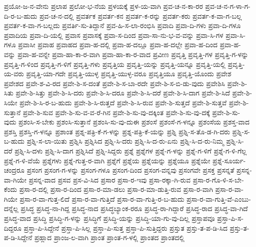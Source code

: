 {ಪ್ರಯೋ-ಜ-ನ-ವೇನು
ಪ್ರಲಾಪ
ಪ್ರಲೋ-ಭ-ನೆಯ
ಪ್ರಳಯಕ್ಕೆ
ಪ್ರಳ-ಯ-ವಾಗಿ
ಪ್ರವ-ಚ-ನ-ಕಾ-ರರ
ಪ್ರವ-ಚ-ನ-ಗ-ಳಾ-ಗ-ದಿ-ರ-ಬ-ಹುದು
ಪ್ರವ-ಚ-ನ-ದಲ್ಲಿ
ಪ್ರವರ್ತಕ
ಪ್ರವರ್ತ-ಕನ
ಪ್ರವರ್ತ-ಕ-ರನ್ನು
ಪ್ರವರ್ತ-ಕರು
ಪ್ರವರ್ತ-ಕ-ವಾ-ಗ-ಬಲ್ಲ
ಪ್ರವರ್ತ-ಕ-ವಾ-ಗ-ಬಲ್ಲದು
ಪ್ರವರ್ತಿ-ಸು-ತಿದ್ದಾನೆ
ಪ್ರವ-ಹಿ-ಸ-ಲಾ-ರಂಭಿಸಿ
ಪ್ರವಾದಿ
ಪ್ರವಾ-ದಿ-ಗಳು
ಪ್ರವಾ-ದಿ-ಗಳೂ
ಪ್ರವಾದಿಯ
ಪ್ರವಾ-ದಿ-ಯಲ್ಲಿ
ಪ್ರವಾಸ
ಪ್ರವಾಸಕ್ಕೆ
ಪ್ರವಾ-ಸ-ದಿಂದ
ಪ್ರವಾ-ಸಾ-ನು-ಭ-ವ-ವನ್ನು
ಪ್ರವಾ-ಸಿ-ಗಳ
ಪ್ರವಾ-ಸಿ-ಗಳೂ
ಪ್ರವಾಸೀ
ಪ್ರವಾಹ
ಪ್ರವಾಹದ
ಪ್ರವಾ-ಹ-ದಲ್ಲಿ
ಪ್ರವಾ-ಹ-ದಲ್ಲೂ
ಪ್ರವಾ-ಹ-ದಲ್ಲೇ
ಪ್ರವಾ-ಹ-ದಿಂದ
ಪ್ರವಾ-ಹ-ವನ್ನು
ಪ್ರವಾ-ಹ-ವನ್ನೇ
ಪ್ರವಾ-ಹಾ-ಕಾ-ರ-ವಾಗಿ
ಪ್ರವಾ-ಹಾ-ಕಾ-ರ-ವಾದ
ಪ್ರವೀಣ
ಪ್ರವೃತ್ತಿ
ಪ್ರವೃತ್ತಿ-ಗಳ
ಪ್ರವೃತ್ತಿ-ಗ-ಳನ್ನು
ಪ್ರವೃತ್ತಿ-ಗ-ಳಿಂದ
ಪ್ರವೃತ್ತಿ-ಗ-ಳಿಗೆ
ಪ್ರವೃತ್ತಿ-ಗಳು
ಪ್ರವೃತ್ತಿಯ
ಪ್ರವೃತ್ತಿ-ಯನ್ನು
ಪ್ರವೃತ್ತಿ-ಯನ್ನೂ
ಪ್ರವೃತ್ತಿ-ಯಲ್ಲಿ
ಪ್ರವೃತ್ತಿ-ಯ-ವರು
ಪ್ರವೃತ್ತಿ-ಯಾ-ಗದೇ
ಪ್ರವೃತ್ತಿ-ಯುಳ್ಳ
ಪ್ರವೃತ್ತಿ-ಯುಳ್ಳ-ವರೂ
ಪ್ರವೃತ್ತಿಯೂ
ಪ್ರವೃತ್ತಿ-ಯೊಂದು
ಪ್ರವೇಶ
ಪ್ರವೇಶದ
ಪ್ರವೇ-ಶ-ವಿ-ರದ
ಪ್ರವೇ-ಶಿ-ಸ-ದಂತೆ
ಪ್ರವೇ-ಶಿ-ಸ-ಬಾ-ರದೇ
ಪ್ರವೇ-ಶಿ-ಸ-ಬಿ-ಡು-ವುದು
ಪ್ರವೇಶಿಸಿ
ಪ್ರವೇ-ಶಿ-ಸಿತು
ಪ್ರವೇ-ಶಿ-ಸಿತ್ತು
ಪ್ರವೇ-ಶಿ-ಸಿ-ದರು
ಪ್ರವೇ-ಶಿ-ಸಿ-ದರೂ
ಪ್ರವೇ-ಶಿ-ಸಿ-ದರೆ
ಪ್ರವೇ-ಶಿ-ಸಿ-ದಾಗ
ಪ್ರವೇ-ಶಿ-ಸಿದೆ
ಪ್ರವೇ-ಶಿ-ಸಿಯೇ
ಪ್ರವೇ-ಶಿ-ಸಿ-ರ-ಬ-ಹುದು
ಪ್ರವೇ-ಶಿ-ಸಿ-ರುತ್ತದೆ
ಪ್ರವೇ-ಶಿ-ಸಿ-ರುವ
ಪ್ರವೇ-ಶಿ-ಸುತ್ತದೆ
ಪ್ರವೇ-ಶಿ-ಸುತ್ತವೆ
ಪ್ರವೇ-ಶಿ-ಸುತ್ತಾನೆ
ಪ್ರವೇ-ಶಿ-ಸುವ
ಪ್ರವೇ-ಶಿ-ಸು-ವ-ವ-ರೆ-ಗಿನ
ಪ್ರವೇ-ಶಿ-ಸು-ವು-ದಕ್ಕಿಂತ
ಪ್ರವೇ-ಶಿ-ಸು-ವು-ದಕ್ಕೆ
ಪ್ರವೇ-ಶಿ-ಸು-ವುದು
ಪ್ರಶಂಸಿ-ಸ-ಬೇಕು
ಪ್ರಶಂಸಿ-ಸುತ್ತಾನೆ
ಪ್ರಶಂಸಿ-ಸು-ವು-ದುಈ
ಪ್ರಶಂಸೆ
ಪ್ರಶಂಸೆ-ಗ-ಳನ್ನೂ
ಪ್ರಶಂಸೆಯ
ಪ್ರಶಸ್ತ-ವಾದ
ಪ್ರಶಸ್ತಿ
ಪ್ರಶಸ್ತಿ-ಗ-ಳನ್ನೂ
ಪ್ರಶಾಂತ
ಪ್ರಶ್ನ-ಪತ್ರಿ-ಕೆ-ಗ-ಳನ್ನು
ಪ್ರಶ್ನ-ಪತ್ರಿ-ಕೆ-ಯನ್ನು
ಪ್ರಶ್ನಿ
ಪ್ರಶ್ನಿ-ಸ-ತೊ-ಡ-ಗಿ-ದರು
ಪ್ರಶ್ನಿ-ಸ-ಬ-ಹುದು
ಪ್ರಶ್ನಿ-ಸ-ಲಾ-ಯಿತು
ಪ್ರಶ್ನಿಸಿ
ಪ್ರಶ್ನಿಸಿದ
ಪ್ರಶ್ನಿ-ಸಿ-ದರು
ಪ್ರಶ್ನಿ-ಸಿ-ದ-ರು-ಏನು
ಪ್ರಶ್ನಿ-ಸಿ-ದ-ರು-ನಿಮ್ಮ
ಪ್ರಶ್ನಿ-ಸಿ-ದರೆ
ಪ್ರಶ್ನಿ-ಸಿ-ದಳು
ಪ್ರಶ್ನಿ-ಸಿ-ದಾಗ
ಪ್ರಶ್ನಿಸಿದೆ
ಪ್ರಶ್ನಿ-ಸಿದ್ದರು
ಪ್ರಶ್ನೆ
ಪ್ರಶ್ನೆಗಳ
ಪ್ರಶ್ನೆ-ಗ-ಳನ್ನು
ಪ್ರಶ್ನೆ-ಗ-ಳಿಗೆ
ಪ್ರಶ್ನೆ-ಗ-ಳಿ-ಗೆಲ್ಲ
ಪ್ರಶ್ನೆ-ಗ-ಳಿ-ವೆಯೆ
ಪ್ರಶ್ನೆಗಳು
ಪ್ರಶ್ನೆ-ಗುತ್ತ-ರ-ವಾಗಿ
ಪ್ರಶ್ನೆಗೆ
ಪ್ರಶ್ನೆಯ
ಪ್ರಶ್ನೆಯನ್ನು
ಪ್ರಶ್ನೆಯೂ
ಪ್ರಶ್ನೆಯೇ
ಪ್ರಶ್ನೆ-ಸೂರ್ಯ-ಚಂದ್ರರೂ
ಪ್ರಸಂಗ
ಪ್ರಸಂಗ-ಗ-ಳನ್ನು
ಪ್ರಸಂಗ-ಗಳೂ
ಪ್ರಸಂಗ-ದಿಂದ
ಪ್ರಸಂಗ-ವನ್ನವು
ಪ್ರಸಂಗವೇ
ಪ್ರಸಕ್ತ
ಪ್ರಸನ್ನತೆ
ಪ್ರಸನ್ನ-ವಾ-ಗಿಯೇ
ಪ್ರಸನ್ನ-ವಾದ
ಪ್ರಸವ
ಪ್ರಸ-ವಿ-ಸಿದ
ಪ್ರಸಾರ
ಪ್ರಸಾ-ರ-ಇವು
ಪ್ರಸಾ-ರಕ್ಕಾ-ಗಿ-ರುವ
ಪ್ರಸಾ-ರ-ಗೊ-ಳಿ-ಸ-ಬೇ-ಕೆಂದು
ಪ್ರಸಾ-ರ-ದಲ್ಲಿ
ಪ್ರಸಾ-ರ-ದಿಂದ
ಪ್ರಸಾ-ರ-ಮಾ-ಡಲು
ಪ್ರಸಾ-ರ-ಮಾ-ಡುತ್ತಿ-ರುವ
ಪ್ರಸಾ-ರ-ವಾಗಿ
ಪ್ರಸಾ-ರ-ವಾ-ಗಿಯೇ
ಪ್ರಸಾ-ರ-ವಾ-ಗುತ್ತ-ಲಿದೆ
ಪ್ರಸಾ-ರ-ವಾ-ಗುತ್ತಿದೆ
ಪ್ರಸಾ-ರ-ವಾ-ಗುತ್ತಿ-ರ-ಬ-ಹುದು
ಪ್ರಸಾ-ರ-ವಾ-ಗುತ್ತಿ-ವೆ-ಎಂಬು-ದನ್ನೆಲ್ಲ
ಪ್ರಸಿದ್ಧ
ಪ್ರಸಿದ್ಧ-ನಾ-ಗಿದ್ದ
ಪ್ರಸಿದ್ಧ-ನಾದ
ಪ್ರಸಿದ್ಧಬ್ಯಾಂಕ-ರರೂ
ಪ್ರಸಿದ್ಧ-ರಾ-ಗಿದ್ದಾರೆ
ಪ್ರಸಿದ್ಧ-ರಾದ
ಪ್ರಸಿದ್ಧ-ವಾ-ಗಿದೆ
ಪ್ರಸಿದ್ಧ-ವಾದ
ಪ್ರಸಿದ್ಧಿ
ಪ್ರಸಿದ್ಧಿ-ಗ-ಳನ್ನು
ಪ್ರಸಿದ್ಧಿಗೆ
ಪ್ರಸಿದ್ಧಿ-ಯನ್ನು
ಪ್ರಸಿದ್ಧಿ-ಯಾ-ಗು-ವು-ದಿಲ್ಲ
ಪ್ರಸ್ತಾಪವೂ
ಪ್ರಸ್ತಾ-ಪಿ-ಸ-ದಿದ್ದರೂ
ಪ್ರಸ್ತಾ-ಪಿ-ಸಿದ್ದೇನೆ
ಪ್ರಸ್ತಾ-ಪಿ-ಸಿಲ್ಲ
ಪ್ರಸ್ತಾ-ಪಿ-ಸುತ್ತ
ಪ್ರಸ್ತಾ-ಪಿ-ಸುತ್ತಿದ್ದರು
ಪ್ರಸ್ತುತ
ಪ್ರಸ್ತು-ತ-ಪ-ಡಿ-ಸಿದ
ಪ್ರಸ್ತು-ತ-ಪ-ಡಿ-ಸಿದ್ದೇನೆ
ಪ್ರಹ್ಲಾದ
ಪ್ರಾಂಜ-ಲ-ವಾಗಿ
ಪ್ರಾಂತ
ಪ್ರಾಂತ-ಗ-ಳಲ್ಲಿ
ಪ್ರಾಂತದ
ಪ್ರಾಂತದಲ್ಲಿ
}
